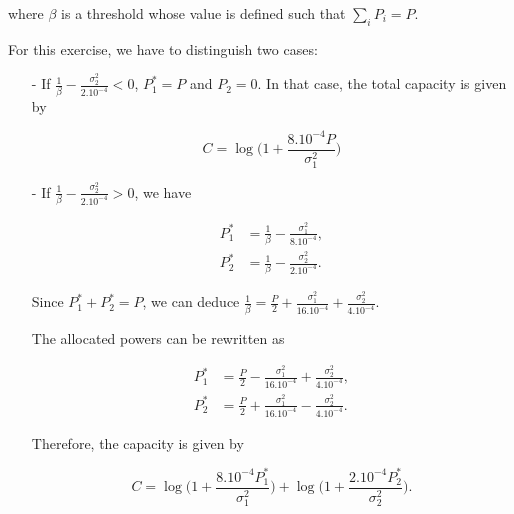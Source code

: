 \documentclass [a4paper, 11pt] {article}
\begin{document}
\begin{solution}
\begin{enumerate}
        where $\beta$ is a threshold whose value is defined such that $\sum_i P_i = P$.
        
        For this exercise, we have to distinguish two cases: 
        
        \begin{itemize}
            \item[-] If $\frac{1}{\beta} - \frac{\sigma_2^2}{2.10^{-4}} < 0$, $P_1^* = P$ and $P_2 = 0$. In that case, the total capacity is given by 
            
            \begin{equation}
                C = \log\bigg(1 + \frac{8.10^{-4}P}{\sigma_1^2}\bigg) 
            \end{equation}
            \item[-] If $\frac{1}{\beta} - \frac{\sigma_2^2}{2.10^{-4}} > 0$, we have 
            
            \begin{align}
                P_1^* &= \frac{1}{\beta} - \frac{\sigma_1^2}{8.10^{-4}},\\
                P_2^* &= \frac{1}{\beta} - \frac{\sigma_2^2}{2.10^{-4}}.
            \end{align}
            
            Since $P_1^* + P_2^* = P$, we can deduce $\frac{1}{\beta} = \frac{P}{2} + \frac{\sigma_1^2}{16.10^{-4}} + \frac{\sigma_2^2}{4.10^{-4}}$.
            
            The allocated powers can be rewritten as 
            
            \begin{align}
                P_1^* &= \frac{P}{2} - \frac{\sigma_1^2}{16.10^{-4}} + \frac{\sigma_2^2}{4.10^{-4}},\\
                P_2^* &= \frac{P}{2} + \frac{\sigma_1^2}{16.10^{-4}} - \frac{\sigma_2^2}{4.10^{-4}}.
            \end{align}
            
            Therefore, the capacity is given by 
            
            \begin{equation}
                C = \log\bigg(1 + \frac{8.10^{-4}P_1^*}{\sigma_1^2}\bigg) + \log\bigg(1 + \frac{2.10^{-4}P_2^*}{\sigma_2^2}\bigg).
            \end{equation}
            
        \end{itemize}
        \end{enumerate}
        

\end{solution}
\end{document}
